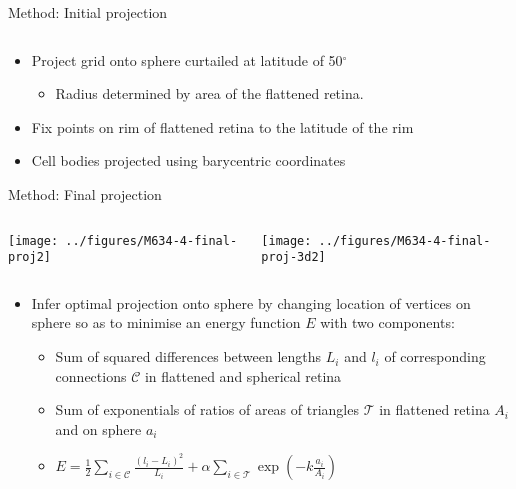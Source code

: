 \documentclass[final,hyperref={pdfpagelabels=false}]{beamer}
\begin{document}
\begin{frame}{}
\begin{columns}[T]
\begin{column}{.33\linewidth}
\begin{block}{Method: Initial projection}
\begin{columns}
\begin{column}{0.5\linewidth}
          \end{column}
        \end{columns}
            \begin{itemize}
            \item Project grid onto sphere curtailed at latitude of 50$^\circ$
              \begin{itemize}
              \item Radius determined by area of the flattened retina.
              \end{itemize}
            \item Fix points on rim of flattened retina to the
              latitude of the rim 
            \item Cell bodies projected using barycentric coordinates
            \end{itemize}

      \end{block}

      \begin{block}{Method: Final projection}
        \begin{columns}
          \begin{column}{0.35\linewidth}
            \texttt{[image: ../figures/M634-4-final-proj2]}
          \end{column}
          \begin{column}{0.5\linewidth}
            \texttt{[image: ../figures/M634-4-final-proj-3d2]}


          \end{column}
        \end{columns}

            \begin{itemize}
            \item Infer optimal projection onto sphere by changing
              location of vertices on sphere so as to minimise an
              energy function $E$ with two components:
              \begin{itemize}
              \item Sum of squared differences between lengths $L_i$
                and $l_i$ of corresponding connections $\mathcal{C}$
                in flattened and spherical retina
              \item Sum of exponentials of ratios of areas  of 
                triangles $\mathcal{T}$ in flattened retina $A_i$ and
                on sphere $a_i$
              \item  $E = \frac{1}{2} \sum_{i\in\mathcal{C}} \frac{(l_i -
              L_i)^2}{L_i}  + \alpha\sum_{i\in\mathcal{T}} \exp(-k\frac{a_i}{A_i})
            $
            

\end{itemize}
\end{itemize}
\end{block}
\end{column}
\end{columns}
\end{frame}
\end{document}
